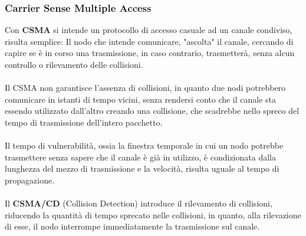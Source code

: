 \documentclass[12pt, letterpaper]{article}
\newcommand{\acc}{\\\hphantom{}\\}
\begin{document}
\subsubsection{Carrier Sense Multiple Access}
Con \textbf{CSMA} si intende un protocollo di accesso casuale ad un canale condiviso, risulta semplice: Il nodo che intende 
comunicare, "ascolta" il canale, cercando di capire se è in corso una trasmissione, in caso contrario, trasmetterà, senza 
alcun controllo o rilevamento delle collisioni.\acc 
Il CSMA non garantisce l'assenza di collisioni, in quanto due nodi potrebbero comunicare in istanti di tempo 
vicini, senza rendersi conto che il canale sta essendo utilizzato dall'altro creando una collisione, che scadrebbe nello 
spreco del tempo di trasmissione dell'intero pacchetto.\acc 
Il tempo di vulnerabilità, ossia la finestra temporale in cui un nodo potrebbe trasmettere senza sapere che il canale 
è già in utilizzo, è condizionata dalla lunghezza del mezzo di trasmissione e la velocità, risulta uguale 
al tempo di propagazione.\acc 
Il \textbf{CSMA/CD} (Collision Detection) introduce il rilevamento di collisioni, riducendo la quantità di tempo sprecato 
nelle collisioni, in quanto, alla rilevazione di esse, il nodo interrompe immediatamente la trasmissione sul canale.
 
\end{document}
